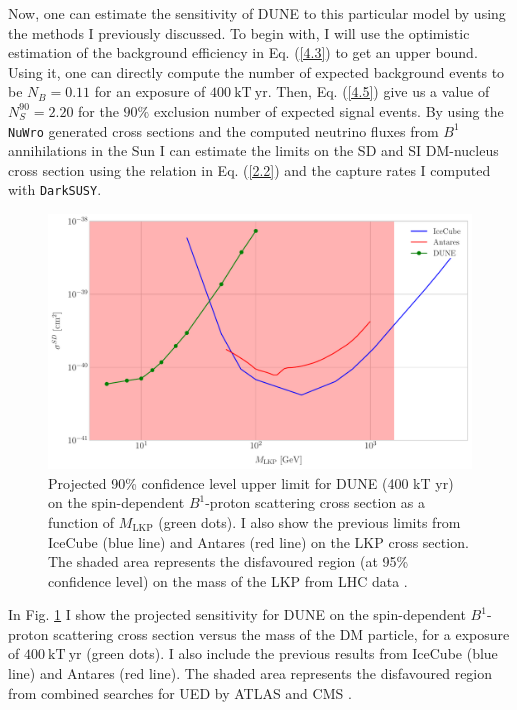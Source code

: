Now, one can estimate the sensitivity of DUNE to this particular model by using the methods I previously discussed. To begin with, I will use the optimistic estimation of the background efficiency in Eq. (\ref{4.3}) to get an upper bound. Using it, one can directly compute the number of expected background events to be $N_{B} = 0.11$ for an exposure of $400 \ \mathrm{kT}  \ \mathrm{yr}$. Then, Eq. (\ref{4.5}) give us a value of $N_{S}^{90} = 2.20$ for the $90\%$ exclusion number of expected signal events. By using the \texttt{NuWro} generated cross sections and the computed neutrino fluxes from $B^{1}$ annihilations in the Sun I can estimate the limits on the SD and SI DM-nucleus cross section using the relation in Eq. (\ref{2.2}) and the capture rates I computed with \texttt{DarkSUSY}.

\begin{figure}[t]
	\centering
	\includegraphics[width=0.9\linewidth]{Images/DM_Analysis/kk_xsection_sd_bounds}
	\caption[Projected 90\% confidence level upper limit for DUNE (400 kT yr) on the spin-dependent $B^{1}$-proton scattering cross section as a function of $M_{\mathrm{LKP}}$.]{Projected 90\% confidence level upper limit for DUNE (400 kT yr) on the spin-dependent $B^{1}$-proton scattering cross section as a function of $M_{\mathrm{LKP}}$ (green dots). I also show the previous limits from IceCube \cite{Bernadich2019} (blue line) and Antares \cite{Zornoza2012} (red line) on the LKP cross section. The shaded area represents the disfavoured region (at 95\% confidence level) on the mass of the LKP from LHC data \cite{Deutschmann2017}.}
	\label{fig:kk_xsection_sd_bounds}
\end{figure}

In Fig. \ref{fig:kk_xsection_sd_bounds} I show the projected sensitivity for DUNE on the spin-dependent $B^{1}$-proton scattering cross section versus the mass of the DM particle, for a exposure of $400 \ \mathrm{kT}  \ \mathrm{yr}$ (green dots). I also include the previous results from IceCube \cite{Bernadich2019} (blue line) and Antares \cite{Zornoza2012} (red line). The shaded area represents the disfavoured region from combined searches for UED by ATLAS and CMS \cite{Deutschmann2017}.

